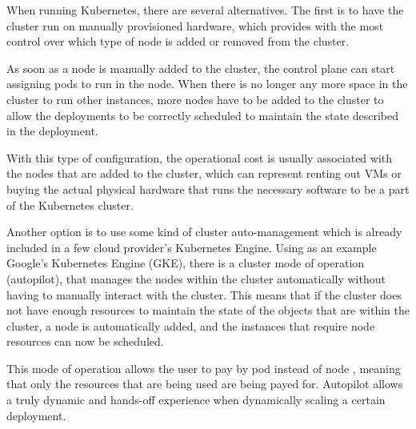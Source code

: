 When running Kubernetes, there are several alternatives. The first is to have
the cluster run on manually provisioned hardware, which provides with the most
control over which type of node is added or removed from the cluster. 

As soon as a node is manually added to the cluster, the control plane can start
assigning pods to run in the node. When there is no longer any more space in the
cluster to run other instances, more nodes have to be added to the cluster to
allow the deployments to be correctly scheduled to maintain the state described
in the deployment.

With this type of configuration, the operational cost is usually associated with
the nodes that are added to the cluster, which can represent renting out VMs or
buying the actual physical hardware that runs the necessary software to be a part
of the Kubernetes cluster.

Another option is to use some kind of cluster auto-management which is
already included in a few cloud provider's Kubernetes Engine. Using as an
example Google's Kubernetes Engine (GKE), there is a cluster mode of operation
(autopilot), that manages the nodes within the cluster automatically
without having to manually interact with the cluster. This means that if the
cluster does not have enough resources to maintain the state of the objects that
are within the cluster, a node is automatically added, and the
instances that require node resources can now be scheduled.

This mode of operation allows the user to pay by pod instead of node
\cite{GKEautopilot}, meaning that only the resources that are being used are
being payed for. Autopilot allows a truly dynamic and hands-off experience when
dynamically scaling a certain deployment.

